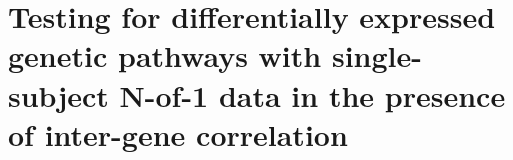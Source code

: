 \chapter{Testing for differentially expressed genetic pathways with single-subject N-of-1 data in the presence of inter-gene correlation}

